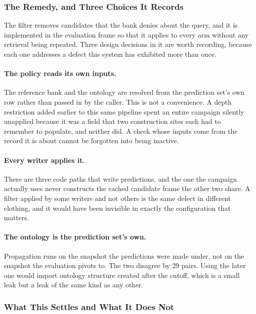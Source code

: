 \subsubsection{The Remedy, and Three Choices It Records}

The filter removes candidates that the bank denies about the query, and it is
implemented in the evaluation frame so that it applies to every arm without any
retrieval being repeated. Three design decisions in it are worth recording, because
each one addresses a defect this system has exhibited more than once.

\paragraph{The policy reads its own inputs.} The reference bank and the ontology are
resolved from the prediction set's own row rather than passed in by the caller. This is
not a convenience. A depth restriction added earlier to this same pipeline spent an
entire campaign silently unapplied because it was a field that two construction sites
each had to remember to populate, and neither did. A check whose inputs come from the
record it is about cannot be forgotten into being inactive.

\paragraph{Every writer applies it.} There are three code paths that write predictions,
and the one the campaign actually uses never constructs the cached candidate frame the
other two share. A filter applied by some writers and not others is the same defect in
different clothing, and it would have been invisible in exactly the configuration that
matters.

\paragraph{The ontology is the prediction set's own.} Propagation runs on the snapshot
the predictions were made under, not on the snapshot the evaluation pivots to. The two
disagree by 29 pairs. Using the later one would import ontology structure created after
the cutoff, which is a small leak but a leak of the same kind as any other.

\subsubsection{What This Settles and What It Does Not}

